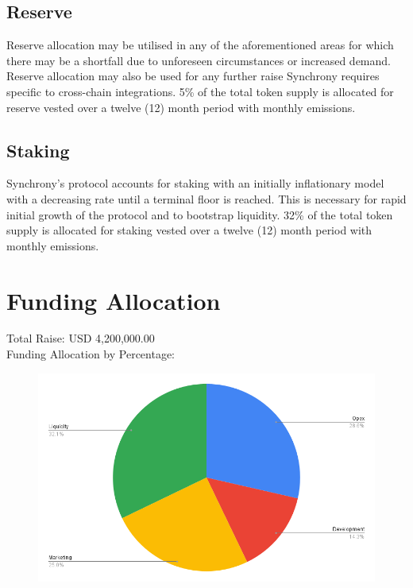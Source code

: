 \documentclass[10pt]{article}
\begin{document}
					\subsection{Reserve}
					Reserve allocation may be utilised in any of the aforementioned areas for which
					there may be a shortfall due to unforeseen circumstances or increased demand.
					Reserve allocation may also be used for any further raise Synchrony requires
					specific to cross-chain integrations. 5\% of the total token supply is allocated
					for reserve vested over a twelve (12) month period with monthly emissions.

					\subsection{Staking}
					Synchrony's protocol accounts for staking with an initially inflationary model
					with a decreasing rate until a terminal floor is reached. This is necessary for
					rapid initial growth of the protocol and to bootstrap liquidity. 32\% of the
					total token supply is allocated for staking vested over a twelve (12) month
					period with monthly emissions.

					\section{Funding Allocation}
					Total Raise: USD 4,200,000.00\\
					Funding Allocation by Percentage:

					\begin{center}
						\begin{figure}[h]
							\includegraphics[scale=0.6]{funding.png}
							\centering
						\end{figure}
					\end{center}
\end{document}
